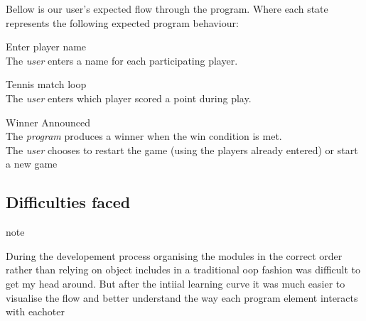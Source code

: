 \bigskip

Bellow is our user's expected flow through the program. Where each state represents the following expected program behaviour:

\begin{description}[align=left]
\item [$s_0$] Enter player name \\ The \textit{user} enters a name for each participating player.
\item [$s_1$] Tennis match loop \\ The \textit{user} enters which player scored a point during play.
\item [$s_2$] Winner Announced \\ The \textit{program} produces a winner when the win condition is met. \\ The \textit{user} chooses to restart the game (using the players already entered) or start a new game
\end{description}

\begin{figure}[!h]
\centering
{}
\end{figure}



\subsection{Difficulties faced}

\large{note}

During the developement process organising the modules in the correct order rather than relying on object includes in a traditional oop fashion was difficult to get my head around. But after the intiial learning curve it was much easier to visualise the flow and better understand the way each program element interacts with eachoter
